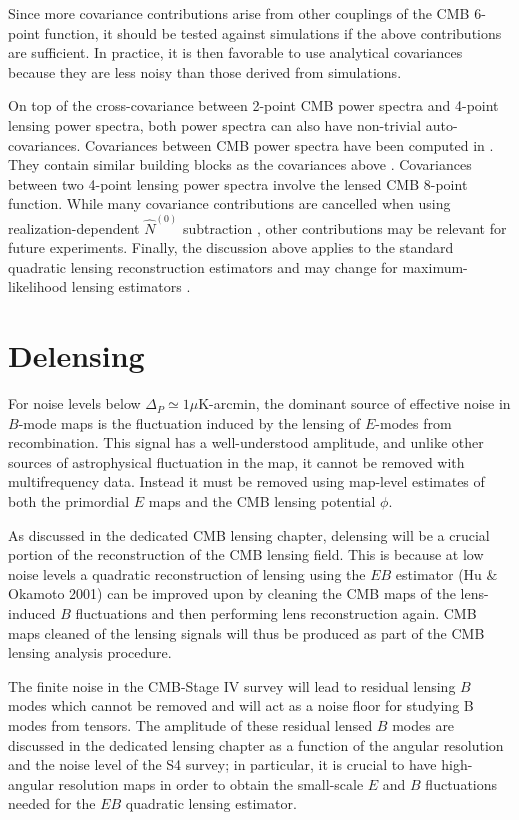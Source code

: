 \documentclass[prd,superscriptaddress,nofootinbib,floatfix,notitlepage]{revtex4-1}
\begin{document}
 Since more covariance contributions arise from other couplings of the CMB 6-point function, it should be tested against simulations if the above contributions are sufficient.  In practice, it is then favorable to use analytical covariances because they are less noisy than those derived from simulations.   
 
On top of the cross-covariance between 2-point CMB power spectra and 4-point lensing power spectra, both power spectra can also have non-trivial auto-covariances.  Covariances between CMB power spectra have been computed in \cite{2006PhRvD..74l3002S,2007PhRvD..75h3501L,BenoitSmithHu1205}. They contain similar building blocks as the covariances above \cite{BenoitSmithHu1205}.  Covariances between two 4-point lensing power spectra involve the lensed CMB 8-point function.  While many covariance contributions are cancelled when using realization-dependent $\hat N^{(0)}$ subtraction \cite{duncan1008}, other contributions may be relevant for future experiments.  Finally, the discussion above applies to the standard quadratic lensing reconstruction estimators and may change for maximum-likelihood lensing estimators \cite{HirataSeljak0209489}.

\section{Delensing}
For noise levels below $\Delta_P \simeq 1 \mu$K-arcmin,  the dominant source of effective noise in $B$-mode maps is the fluctuation induced by the lensing of $E$-modes from recombination.  This signal has a well-understood amplitude, and unlike other sources of astrophysical fluctuation in the map, it cannot be removed with multifrequency data.  Instead it must be removed using map-level estimates of both the primordial $E$ maps and the CMB lensing potential $\phi$.  

As discussed in the dedicated CMB lensing chapter, delensing will be a crucial portion of the reconstruction of the CMB lensing field.  This is because at low noise levels a quadratic reconstruction of lensing using the $EB$ estimator (Hu $\&$ Okamoto 2001) can be improved upon by cleaning the CMB maps of the lens-induced $B$ fluctuations and then performing lens reconstruction again.   CMB maps cleaned of the lensing signals will thus be produced as part of the CMB lensing analysis procedure.

The finite noise in the CMB-Stage IV survey will lead to residual lensing $B$ modes which cannot be removed and will act as a noise floor for studying B modes from tensors.  The amplitude of these residual lensed $B$ modes are discussed in the dedicated lensing chapter as a function of the angular resolution and the noise level of the S4 survey; in particular, it is crucial to have high-angular resolution maps in order to obtain the small-scale $E$ and $B$ fluctuations needed for the $EB$ quadratic lensing estimator.
\end{document}
